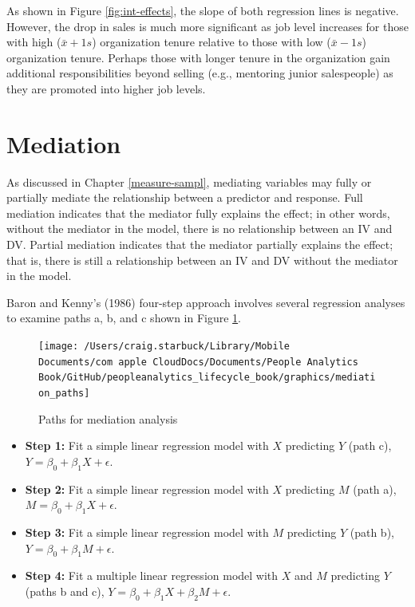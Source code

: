 \documentclass[
]{book}
\providecommand{\tightlist}{%
  \setlength{\itemsep}{0pt}\setlength{\parskip}{0pt}}
\begin{document}
As shown in Figure \ref{fig:int-effects}, the slope of both regression lines is negative. However, the drop in sales is much more significant as job level increases for those with high (\(\bar{x} + 1s\)) organization tenure relative to those with low (\(\bar{x} - 1s\)) organization tenure. Perhaps those with longer tenure in the organization gain additional responsibilities beyond selling (e.g., mentoring junior salespeople) as they are promoted into higher job levels.

\hypertarget{mediation}{%
\section{Mediation}\label{mediation}}

As discussed in Chapter \ref{measure-sampl}, mediating variables may fully or partially mediate the relationship between a predictor and response. Full mediation indicates that the mediator fully explains the effect; in other words, without the mediator in the model, there is no relationship between an IV and DV. Partial mediation indicates that the mediator partially explains the effect; that is, there is still a relationship between an IV and DV without the mediator in the model.

Baron and Kenny's (1986) four-step approach involves several regression analyses to examine paths a, b, and c shown in Figure \ref{fig:med-paths}.

\begin{figure}

{\centering \texttt{[image: /Users/craig.starbuck/Library/Mobile Documents/com~apple~CloudDocs/Documents/People Analytics Book/GitHub/peopleanalytics\_lifecycle\_book/graphics/mediation\_paths]} 

}

\caption{Paths for mediation analysis}\label{fig:med-paths}
\end{figure}

\begin{itemize}
\tightlist
\item
  \textbf{Step 1:} Fit a simple linear regression model with \(X\) predicting \(Y\) (path c), \(Y = \beta_0 + \beta_1 X + \epsilon\).
\item
  \textbf{Step 2:} Fit a simple linear regression model with \(X\) predicting \(M\) (path a), \(M = \beta_0 + \beta_1 X + \epsilon\).
\item
  \textbf{Step 3:} Fit a simple linear regression model with \(M\) predicting \(Y\) (path b), \(Y = \beta_0 + \beta_1 M + \epsilon\).
\item
  \textbf{Step 4:} Fit a multiple linear regression model with \(X\) and \(M\) predicting \(Y\) (paths b and c), \(Y = \beta_0 + \beta_1 X + \beta_2 M + \epsilon\).
\end{itemize}
\end{document}
